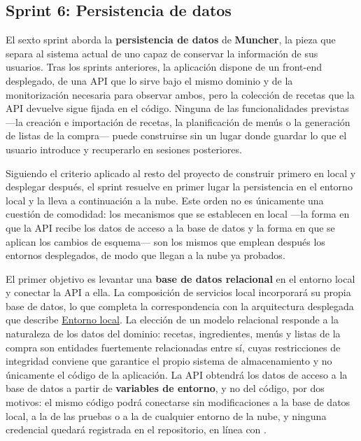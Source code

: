 \subsection*{Sprint 6: Persistencia de datos}

El sexto sprint aborda la \textbf{persistencia de datos} de \textbf{Muncher},
la pieza que separa al sistema actual de uno capaz de conservar la información
de sus usuarios. Tras los sprints anteriores, la aplicación dispone de un
front-end desplegado, de una API que lo sirve bajo el mismo dominio y de la
monitorización necesaria para observar ambos, pero la colección de recetas que
la API devuelve sigue fijada en el código. Ninguna de las funcionalidades
previstas —la creación e importación de recetas, la planificación de menús o la
generación de listas de la compra— puede construirse sin un lugar donde
guardar lo que el usuario introduce y recuperarlo en sesiones posteriores.

Siguiendo el criterio aplicado al resto del proyecto de construir primero en
local y desplegar después, el sprint resuelve en primer lugar la persistencia
en el entorno local y la lleva a continuación a la nube. Este orden no es
únicamente una cuestión de comodidad: los mecanismos que se establecen en local
—la forma en que la API recibe los datos de acceso a la base de datos y la
forma en que se aplican los cambios de esquema— son los mismos que emplean
después los entornos desplegados, de modo que llegan a la nube ya probados.

El primer objetivo es levantar una \textbf{base de datos relacional} en el
entorno local y conectar la API a ella. La composición de servicios local
incorporará su propia base de datos, lo que completa la correspondencia con la
arquitectura desplegada que describe
\hyperref[sec:entorno-local]{Entorno local}. La elección de un modelo
relacional responde a la naturaleza de los datos del dominio: recetas,
ingredientes, menús y listas de la compra son entidades fuertemente
relacionadas entre sí, cuyas restricciones de integridad conviene que garantice
el propio sistema de almacenamiento y no únicamente el código de la
aplicación. La API obtendrá los datos de acceso a la base de datos a partir de
\textbf{variables de entorno}, y no del código, por dos motivos: el mismo
código podrá conectarse sin modificaciones a la base de datos local, a la de
las pruebas o a la de cualquier entorno de la nube, y ninguna credencial
quedará registrada en el repositorio, en línea con .


